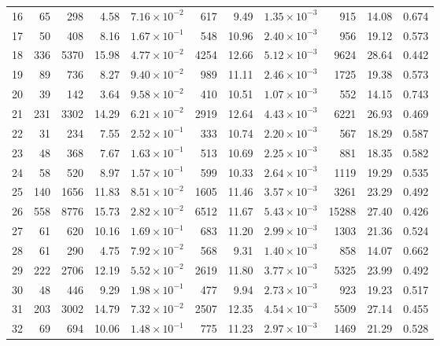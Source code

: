 \begin{table}[ht]
\begin{adjustbox}{max width=\textwidth}
\begin{tabular}{lrrrrrrrrrr}
  16 & 65 & 298 & 4.58 & $7.16 \times 10^{-2}$ & 617 & 9.49 & $1.35 \times 10^{-3}$ & 915 & 14.08 & 0.674 \\ 
  17 & 50 & 408 & 8.16 & $1.67 \times 10^{-1}$ & 548 & 10.96 & $2.40 \times 10^{-3}$ & 956 & 19.12 & 0.573 \\ 
  18 & 336 & 5370 & 15.98 & $4.77 \times 10^{-2}$ & 4254 & 12.66 & $5.12 \times 10^{-3}$ & 9624 & 28.64 & 0.442 \\ 
  19 & 89 & 736 & 8.27 & $9.40 \times 10^{-2}$ & 989 & 11.11 & $2.46 \times 10^{-3}$ & 1725 & 19.38 & 0.573 \\ 
  20 & 39 & 142 & 3.64 & $9.58 \times 10^{-2}$ & 410 & 10.51 & $1.07 \times 10^{-3}$ & 552 & 14.15 & 0.743 \\ 
  21 & 231 & 3302 & 14.29 & $6.21 \times 10^{-2}$ & 2919 & 12.64 & $4.43 \times 10^{-3}$ & 6221 & 26.93 & 0.469 \\ 
  22 & 31 & 234 & 7.55 & $2.52 \times 10^{-1}$ & 333 & 10.74 & $2.20 \times 10^{-3}$ & 567 & 18.29 & 0.587 \\ 
  23 & 48 & 368 & 7.67 & $1.63 \times 10^{-1}$ & 513 & 10.69 & $2.25 \times 10^{-3}$ & 881 & 18.35 & 0.582 \\ 
  24 & 58 & 520 & 8.97 & $1.57 \times 10^{-1}$ & 599 & 10.33 & $2.64 \times 10^{-3}$ & 1119 & 19.29 & 0.535 \\ 
  25 & 140 & 1656 & 11.83 & $8.51 \times 10^{-2}$ & 1605 & 11.46 & $3.57 \times 10^{-3}$ & 3261 & 23.29 & 0.492 \\ 
  26 & 558 & 8776 & 15.73 & $2.82 \times 10^{-2}$ & 6512 & 11.67 & $5.43 \times 10^{-3}$ & 15288 & 27.40 & 0.426 \\ 
  27 & 61 & 620 & 10.16 & $1.69 \times 10^{-1}$ & 683 & 11.20 & $2.99 \times 10^{-3}$ & 1303 & 21.36 & 0.524 \\ 
  28 & 61 & 290 & 4.75 & $7.92 \times 10^{-2}$ & 568 & 9.31 & $1.40 \times 10^{-3}$ & 858 & 14.07 & 0.662 \\ 
  29 & 222 & 2706 & 12.19 & $5.52 \times 10^{-2}$ & 2619 & 11.80 & $3.77 \times 10^{-3}$ & 5325 & 23.99 & 0.492 \\ 
  30 & 48 & 446 & 9.29 & $1.98 \times 10^{-1}$ & 477 & 9.94 & $2.73 \times 10^{-3}$ & 923 & 19.23 & 0.517 \\ 
  31 & 203 & 3002 & 14.79 & $7.32 \times 10^{-2}$ & 2507 & 12.35 & $4.54 \times 10^{-3}$ & 5509 & 27.14 & 0.455 \\ 
  32 & 69 & 694 & 10.06 & $1.48 \times 10^{-1}$ & 775 & 11.23 & $2.97 \times 10^{-3}$ & 1469 & 21.29 & 0.528 \\ 

\end{tabular}
\end{adjustbox}
\end{table}
